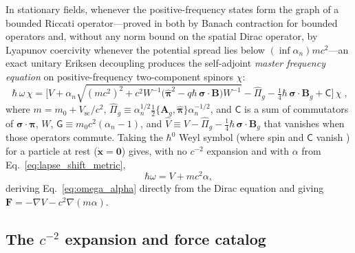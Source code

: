 \documentclass[aps,prd,onecolumn,tightenlines,nofootinbib,notitlepage,10pt,floatfix]{revtex4-2}
\theoremstyle{indentedtheorem}
\begin{document}
In stationary fields, whenever the positive-frequency states form the graph of a bounded Riccati operator---proved in \citet{HutchisonWavefn2026} both by Banach contraction for bounded operators and, without any norm bound on the spatial Dirac operator, by Lyapunov coercivity whenever the potential spread lies below $(\inf\alpha_n)mc^2$---an exact unitary Eriksen decoupling \citep{Foldy1950Dirac,Eriksen1958Foldy} produces the self-adjoint \emph{master frequency equation} on positive-frequency two-component spinors $\chi$:
\begin{equation}
    \boxed{\;
    \hbar\,\omega\,\chi = \Big[V + \alpha_n\sqrt{(mc^2)^2 + c^2 W^{-1}\big(\hat{\boldsymbol{\pi}}^2 - q\hbar\,\boldsymbol{\sigma}\cdot\mathbf{B}\big)W^{-1}} - \hat{\Pi}_g - \tfrac{1}{4}\hbar\,\boldsymbol{\sigma}\cdot\mathbf{B}_g + \mathsf{C}\Big]\,\chi\;} ,
    \label{eq:master}
\end{equation}
where $m=m_0+V_\text{sc}/c^2$, $\hat{\Pi}_g\equiv\alpha_n^{1/2}\tfrac{1}{2}\{\mathbf{A}_g,\hat{\boldsymbol{\pi}}\}\alpha_n^{-1/2}$, and $\mathsf{C}$ is a sum of commutators of $\boldsymbol{\sigma}\cdot\hat{\boldsymbol{\pi}}$, $W$, $\mathsf{G}\equiv m_0 c^2(\alpha_n-1)$, and $\hat{V}\equiv V-\hat{\Pi}_g-\tfrac{1}{4}\hbar\,\boldsymbol{\sigma}\cdot\mathbf{B}_g$ that vanishes when those operators commute. Taking the $\hbar^0$ Weyl symbol (where spin and $\mathsf{C}$ vanish \citep{PanatiSpohnTeufel2003Space,HutchisonWavefn2026}) for a particle at rest ($\dot{\mathbf{x}}=\mathbf{0}$) gives, with no $c^{-2}$ expansion and with $\alpha$ from Eq.~\eqref{eq:lapse_shift_metric},
\begin{equation}
    \hbar\omega = V + mc^2\alpha ,
    \label{eq:static_master}
\end{equation}
deriving Eq.~\eqref{eq:omega_alpha} directly from the Dirac equation and giving $\mathbf{F}=-\nabla V-c^2\nabla(m\alpha)$.

\subsection{The \texorpdfstring{$c^{-2}$}{1/c2} expansion and force catalog}
\label{sec:expansion_orders}
\end{document}
